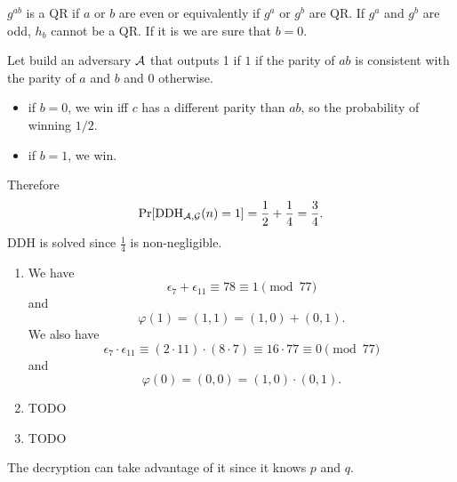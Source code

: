 \begin{solution}
\begin{enumerate}
      $g^{ab}$ is a QR if $a$ or $b$ are even or equivalently
      if $g^a$ or $g^b$ are QR.
      If $g^a$ and $g^b$ are odd, $h_b$ cannot be a QR.
      If it is we are sure that $b = 0$.

      Let build an adversary $\mathcal{A}$ that outputs 1 if $1$ if the parity of
      $ab$ is consistent with the parity of $a$ and $b$ and $0$ otherwise.
      \begin{itemize}
        \item if $b = 0$, we win iff $c$ has a different parity than $ab$, so the probability of winning $1/2$.
        \item if $b = 1$, we win.
      \end{itemize}
      Therefore
      \[ \Pr[\operatorname{DDH}_{\mathcal{A},\mathcal{G}}(n) = 1] = \frac{1}{2} + \frac{1}{4} = \frac{3}{4}. \]
      DDH is solved since $\frac{1}{4}$ is non-negligible.
  \end{enumerate}
\end{solution}

\begin{solution}
  \begin{enumerate}
    \item
      We have
      \[ \epsilon_7 + \epsilon_{11} \equiv 78 \equiv 1 \pmod{77} \]
      and
      \[ \varphi(1) = (1,1) = (1,0) + (0,1). \]
      We also have
      \[ \epsilon_7 \cdot \epsilon_{11} \equiv (2 \cdot 11) \cdot (8 \cdot 7) \equiv 16 \cdot 77 \equiv 0 \pmod{77} \]
      and
      \[ \varphi(0) = (0,0) = (1,0) \cdot (0,1). \]
    \item TODO
    \item TODO
  \end{enumerate}
  The decryption can take advantage of it since it knows $p$ and $q$.
\end{solution}

